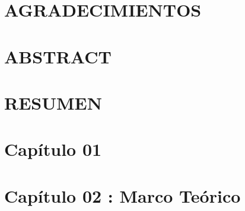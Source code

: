 \documentclass[pdftex,spanish]{pucthesis}	%
\begin{document}

 \label{acknowledgements} %
\chapter*{AGRADECIMIENTOS}


\cleardoublepage



\tableofcontents
{} \label{listoffigures}
\listoffigures
{} \label{listoftables}
\listoftables
\cleardoublepage



 \label{abstract}
\chapter*{ABSTRACT}

\cleardoublepage

 \label{resumen}
\chapter*{RESUMEN}

\cleardoublepage



\chapter[Capítulo 01]{Capítulo 01}


\chapter[Capítulo 02 : Marco Teórico]{Capítulo 02 : Marco Teórico} \label{ch2}

\end{document}
